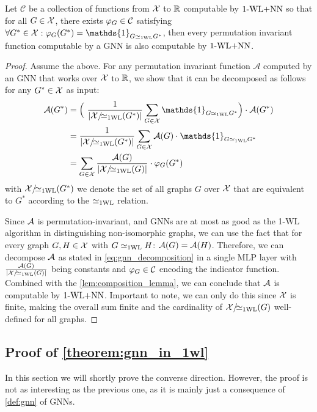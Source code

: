 \begin{lemma}\label{lem:decompose_gnn_as_wl}
    Let $\mathcal{C}$ be a collection of functions from $\mathcal{X}$ to $\mathbb{R}$ computable by $\text{1-WL+NN}$ so that for all $G \in \mathcal{X}$, there exists 
    $\varphi_G \in \mathcal{C}$ satisfying $\forall G^* \in \cX: \varphi_G(G^*) = \mathds{1}_{G \wliso G^*}$, then every permutation invariant function computable by a GNN is also computable by $\text{1-WL+NN}$.
\end{lemma}

\begin{proof}
    Assume the above. For any permutation invariant function $\mathcal{A}$ computed by an GNN that works over $\mathcal{X}$ to $\mathbb{R}$, we show that it can be decomposed as follows for any $G^* \in \mathcal{X}$ as input:
    \begin{align}\label{eq:gnn_decomposition}
        \mathcal{A}(G^*) &= \Bigl( \ \frac{1}{|\cX/\!{\wliso}(G^*)|}\sum_{G \in \cX} \mathds{1}_{G \wliso G^*} \Bigr) \cdot \mathcal{A}(G^*) \nonumber \\
        &= \frac{1}{|\cX/\!{\wliso}(G^*)|}\sum_{G \in \cX} \mathcal{A}(G) \cdot \mathds{1}_{G \wliso G^*} \nonumber \\
        &= \sum_{G \in \cX} \frac{\mathcal{A}(G)}{|\cX/\!{\wliso}(G)|}  \cdot \varphi_G(G^*)
    \end{align}
    with $\mathcal{X}/\!{\simeq_{\text{1WL}}}(G^*)$ we denote the set of all graphs $G$ over $\mathcal{X}$ that are equivalent to $G^*$ according to the $\simeq_{\text{1WL}}$ relation.

    Since $\mathcal{A}$ is permutation-invariant, and GNNs are at most as good as the 1-WL algorithm in distinguishing non-isomorphic graphs, we can use the fact that for every graph $G,H \in \mathcal{X}$ with $G \simeq_{\text{1WL}} H$: $\mathcal{A}(G) = \mathcal{A}(H)$. Therefore, we can decompose $\mathcal{A}$ as stated in \autoref{eq:gnn_decomposition} in a single MLP layer with $\frac{\mathcal{A}(G)}{|\mathcal{X}/\!{\simeq_{\text{1WL}}}(G)|}$ being constants and $\varphi_G \in \mathcal{C}$ encoding the indicator function. Combined with the \cref{lem:composition_lemma}, we can conclude that $\mathcal{A}$ is computable by $\text{1-WL+NN}$. Important to note, we can only do this since $\mathcal{X}$ is finite, making the overall sum finite and the cardinality of $\mathcal{X}/\!{\simeq_{\text{1WL}}}(G)$ well-defined for all graphs.
\end{proof}

\subsection{Proof of \cref{theorem:gnn_in_1wl}}
In this section we will shortly prove the converse direction. However, the proof is not as interesting as the previous one, as it is mainly just a consequence of \cref{def:gnn} of GNNs.

